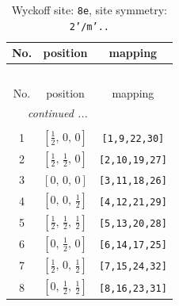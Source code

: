 \documentclass[fleqn,8pt]{jsarticle}
\begin{document}
\renewcommand{\arraystretch}{1.2}
\begin{longtable}{ccc}
\caption{Wyckoff site: {\tt 8e}, site symmetry: {\tt 2'/m'..}}
 \\
 \hline \hline
No. & position & mapping \\ \hline \endfirsthead

\multicolumn{2}{l}{\tablename\ \thetable{}} \\
 \hline \hline
No. & position & mapping \\ \hline \endhead

 \hline \hline
\multicolumn{2}{r}{\footnotesize\it continued ...} \\ \endfoot

 \hline \hline
\multicolumn{2}{r}{} \\ \endlastfoot

1 & $\left[ \frac{1}{2},\, 0,\, 0 \right]$ & {\tt [1,9,22,30]} \\ \hline
2 & $\left[ \frac{1}{2},\, \frac{1}{2},\, 0 \right]$ & {\tt [2,10,19,27]} \\ \hline
3 & $\left[ 0,\, 0,\, 0 \right]$ & {\tt [3,11,18,26]} \\ \hline
4 & $\left[ 0,\, 0,\, \frac{1}{2} \right]$ & {\tt [4,12,21,29]} \\ \hline
5 & $\left[ \frac{1}{2},\, \frac{1}{2},\, \frac{1}{2} \right]$ & {\tt [5,13,20,28]} \\ \hline
6 & $\left[ 0,\, \frac{1}{2},\, 0 \right]$ & {\tt [6,14,17,25]} \\ \hline
7 & $\left[ \frac{1}{2},\, 0,\, \frac{1}{2} \right]$ & {\tt [7,15,24,32]} \\ \hline
8 & $\left[ 0,\, \frac{1}{2},\, \frac{1}{2} \right]$ & {\tt [8,16,23,31]} \\
\end{longtable}
\renewcommand{\arraystretch}{1.2}
\end{document}
